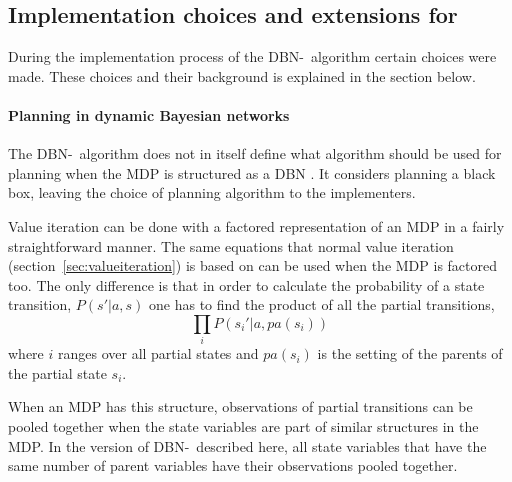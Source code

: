 \subsection{Implementation choices and extensions for \etre}
\label{sec:e3_our_contribution}
During the implementation process of the DBN-\etre\ algorithm certain choices were made. These choices and their background is explained in the section below.

\paragraph{Planning in dynamic Bayesian networks}

The DBN-\etre\ algorithm does not in itself define what algorithm should be
used for planning when the MDP is structured as a DBN
\parencite{kearns1999efficient}. It considers planning a black box, leaving the
choice of planning algorithm to the implementers. 

Value iteration can be done with a factored representation of an MDP in a
fairly straightforward manner. The same equations that normal value iteration
(section~\ref{sec:valueiteration}) is based on can be used when the MDP is
factored too. The only difference is that in order to calculate the probability
of a state transition, $P(s'| a, s)$ one has to find the product of all the
partial transitions,
\begin{equation}
  \prod\limits _{i} P\left(s_i' | a, pa(s_i)\right)
\end{equation}
where $i$ ranges over all partial states and $pa(s_i)$ is the setting of the
parents of the partial state $s_i$.

When an MDP has this structure, observations of partial transitions can be
pooled together when the state variables are part of similar structures in the
MDP. In the version of DBN-\etre\ described here, all state variables that have
the same number of parent variables have their observations pooled together. 


